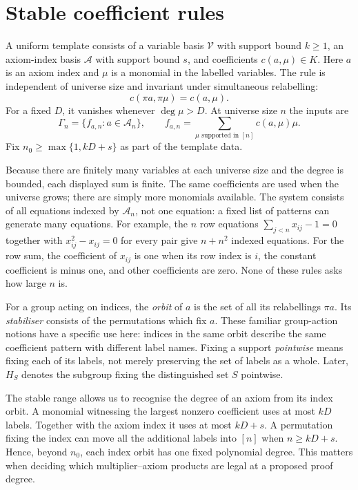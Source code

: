 \section{Stable coefficient rules}
\begin{definition}\label{tx:def:template}
A uniform template consists of a variable basis $\mathcal V$ with
support bound $k\ge1$, an axiom-index basis $\mathcal A$ with support
bound $s$, and coefficients $c(a,\mu)\in K$. Here $a$ is an axiom
index and $\mu$ is a monomial in the labelled variables. The rule is
independent of universe size and invariant under simultaneous relabelling:
\[
                 c(\pi a,\pi\mu)=c(a,\mu).
\]
For a fixed $D$, it vanishes whenever $\deg\mu>D$. At universe size $n$ the
inputs are
\begin{equation}\label{tx:eq:template-instance}
 \Gamma_n=\{f_{a,n}:a\in\mathcal A_n\},\qquad
 f_{a,n}=\sum_{\mu\text{ supported in }[n]}c(a,\mu)\mu.
\end{equation}
Fix $n_0\ge\max\{1,kD+s\}$ as part of the template data.
\end{definition}

Because there are finitely many variables at each universe size and the degree
is bounded, each displayed sum is finite. The same coefficients are
used when the universe grows; there are simply more monomials available.
The system consists of all equations indexed by $\mathcal A_n$, not
one equation: a fixed list of patterns can generate many equations.
For example, the $n$ row equations $\sum_{j<n}x_{ij}-1=0$ together
with $x_{ij}^2-x_{ij}=0$ for every pair give $n+n^2$ indexed equations.
For the row sum, the coefficient of $x_{ij}$ is one when its row index
is $i$, the constant coefficient is minus one, and other coefficients
are zero. None of these rules asks how large $n$ is.

For a group acting on indices, the \emph{orbit} of $a$ is the set
of all its relabellings $\pi a$. Its \emph{stabiliser} consists of the
permutations which fix $a$. These familiar group-action notions have
a specific use here: indices in the same orbit describe the same
coefficient pattern with different label names. Fixing a support
\emph{pointwise} means fixing each of its labels, not merely preserving
the set of labels as a whole. Later, $H_S$ denotes the subgroup fixing
the distinguished set $S$ pointwise.

The stable range allows us to recognise the degree of an axiom from
its index orbit. A monomial witnessing the largest nonzero coefficient
uses at most $kD$ labels. Together with the axiom index it uses at most
$kD+s$. A permutation fixing the index can move all the additional
labels into $[n]$ when $n\ge kD+s$. Hence, beyond $n_0$, each index
orbit has one fixed polynomial degree. This matters when deciding which
multiplier--axiom products are legal at a proposed proof degree.

